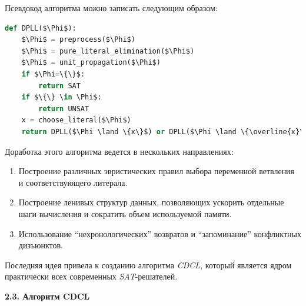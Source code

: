 Псевдокод алгоритма можно записать следующим образом:



\lstset{style=mystyle}

\lstset{xleftmargin=1.5cm,frame=tlbr,framesep=8pt,framerule=0pt}

\begin{lstlisting}[language=Python, mathescape=true]
def DPLL($\Phi$):	
	$\Phi$ = preprocess($\Phi$)
 	$\Phi$ = pure_literal_elimination($\Phi$)
 	$\Phi$ = unit_propagation($\Phi$)	
	if $\Phi=\{\}$:
		return SAT
	if $\{\} \in \Phi$:
		return UNSAT
 	x = choose_literal($\Phi$)
	return DPLL($\Phi \land \{x\}$) or DPLL($\Phi \land \{\overline{x}\}$)
\end{lstlisting}

\vspace{5pt}

Доработка этого алгоритма ведется в нескольких направлениях:

\begin{enumerate}
\item Построение различных эвристических правил выбора переменной ветвления и соответствующего литерала.
\item Построение ленивых структур данных, позволяющих ускорить отдельные шаги вычисления и сократить объем используемой памяти.
\item Использование \enquote{нехронологических} возвратов и \enquote{запоминание} конфликтных дизъюнктов. 
\end{enumerate}

Последняя идея привела к созданию алгоритма \textit{CDCL}, который является ядром практически всех современных \textit{SAT}-решателей.

\vspace{5pt}
\textbf{2.3. Алгоритм CDCL}\label{chapters:2.3}
\vspace{5pt}

